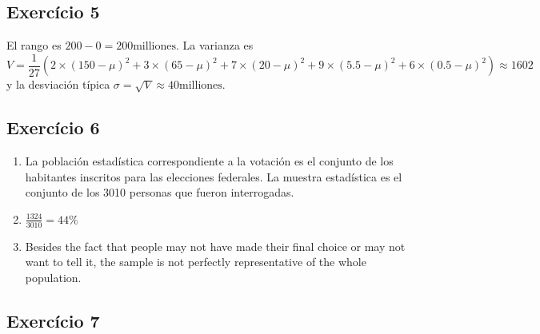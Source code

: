 \subsection{Exercício 5}

El rango es $200 - 0 = 200 \text{milliones}$. La varianza es
$$
V =
\frac{1}{27}
\left(
2 \times \left(150 - \mu \right)^2 +
3 \times \left(65 - \mu \right)^2 +
7 \times \left(20 - \mu \right)^2 +
9 \times \left(5.5 - \mu \right)^2 +
6 \times \left(0.5 - \mu \right)^2
\right) \approx 1602
$$
y la desviación típica $\sigma = \sqrt{V} \approx 40 \text{milliones}$.

\subsection*{Exercício 6}

\begin{enumerate}
\item La población estadística correspondiente a la votación es el conjunto de
  los habitantes inscritos para las elecciones federales. La muestra
  estadística es el conjunto de los 3010 personas que fueron interrogadas.
\item $\frac{1324}{3010} = 44\%$
\item Besides the fact that people may not have made their final choice or
  may not want to tell it, the sample is not perfectly representative of
  the whole population.
\end{enumerate}

\subsection*{Exercício 7}

